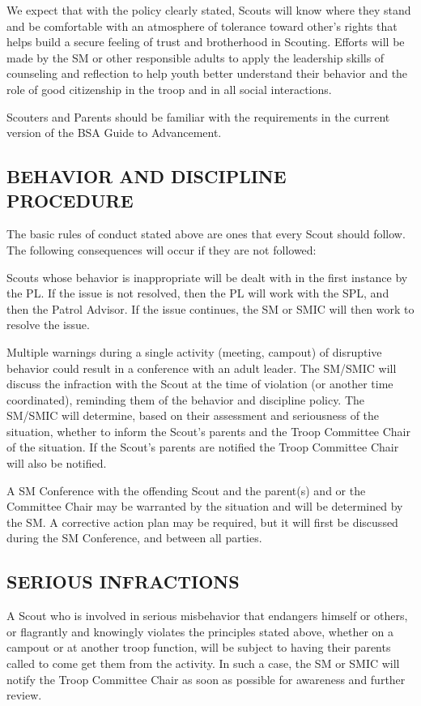 \documentclass{ltxguide}
\begin{document}
We expect that with the policy clearly stated, Scouts will know where they stand and be comfortable with an atmosphere of tolerance toward other's rights that helps build a secure feeling of trust and brotherhood in Scouting. Efforts will be made by the \ac{SM} or other responsible adults to apply the leadership skills of counseling and reflection to help youth better understand their behavior and the role of good citizenship in the troop and in all social interactions.

Scouters and Parents should be familiar with the requirements in the current version of the \ac{BSA} Guide to Advancement.

\subsection{BEHAVIOR AND DISCIPLINE PROCEDURE}
The basic rules of conduct stated above are ones that every Scout should follow. The following consequences will occur if they are not followed:

Scouts whose behavior is inappropriate will be dealt with in the first instance by the \ac{PL}. If the issue is not resolved, then the \ac{PL} will work with the \ac{SPL}, and then the Patrol Advisor. If the issue continues, the \ac{SM} or SMIC will then work to resolve the issue.

Multiple warnings during a single activity (meeting, campout) of disruptive behavior could result in a conference with an adult leader. The SM/SMIC will discuss the infraction with the Scout at the time of violation (or another time coordinated), reminding them of the behavior and discipline policy. The SM/SMIC will determine, based on their assessment and seriousness of the situation, whether to inform the Scout's parents and the Troop Committee Chair of the situation. If the Scout's parents are notified the Troop Committee Chair will also be notified.

A \ac{SM} Conference with the offending Scout and the parent(s) and or the Committee Chair may be warranted by the situation and will be determined by the \ac{SM}. A corrective action plan may be required, but it will first be discussed during the \ac{SM} Conference, and between all parties.

\subsection{SERIOUS INFRACTIONS}
A Scout who is involved in serious misbehavior that endangers himself or others, or flagrantly and knowingly violates the principles stated above, whether on a campout or at another troop function, will be subject to having their parents called to come get them from the activity. In such a case, the \ac{SM} or SMIC will notify the Troop Committee Chair as soon as possible for awareness and further review.
\end{document}
